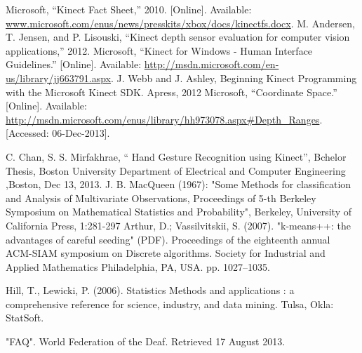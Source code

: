 \documentclass[12pt]{report}           %
\begin{document}
\begin{thebibliography}{80}
 Microsoft, “Kinect Fact Sheet,” 2010. [Online]. Available: \url{www.microsoft.com/enus/news/presskits/xbox/docs/kinectfs.docx}.
M. Andersen, T. Jensen, and P. Lisouski, “Kinect depth sensor evaluation for computer
vision applications,” 2012.
Microsoft, “Kinect for Windows - Human Interface Guidelines.” [Online]. Available:
\url{http://msdn.microsoft.com/en-us/library/jj663791.aspx}.
J. Webb and J. Ashley, Beginning Kinect Programming with the Microsoft Kinect SDK.
Apress, 2012
Microsoft, “Coordinate Space.” [Online]. Available: \url{http://msdn.microsoft.com/enus/library/hh973078.aspx#Depth\_Ranges}.
[Accessed: 06-Dec-2013].

C. Chan, S. S. Mirfakhrae, “ Hand Gesture Recognition using
Kinect”, Bchelor Thesis, Boston University Department of
Electrical and Computer Engineering ,Boston, Dec 13, 2013.
J. B. MacQueen (1967): "Some Methods for classification and Analysis of Multivariate Observations, Proceedings of 5-th Berkeley Symposium on Mathematical Statistics and Probability", Berkeley, University of California Press, 1:281-297
Arthur, D.; Vassilvitskii, S. (2007). "k-means++: the advantages of careful seeding" (PDF). Proceedings of the eighteenth annual ACM-SIAM symposium on Discrete algorithms. Society for Industrial and Applied Mathematics Philadelphia, PA, USA. pp. 1027–1035.

Hill, T.,  Lewicki, P. (2006). Statistics Methods and applications : a comprehensive reference for science, industry, and data mining. Tulsa, Okla: StatSoft.

 "FAQ". World Federation of the Deaf. Retrieved 17 August 2013.
 
 
\end{thebibliography}
\end{document}
